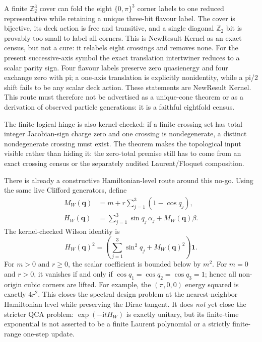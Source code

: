 \documentclass[11pt]{article}
\newcommand{\ii}{\mathrm{i}}
\newcommand{\id}{\mathbf{1}}
\begin{document}
A finite $\mathbb Z_2^3$ cover can fold the eight $\{0,\pi\}^3$ corner labels
to one reduced representative while retaining a unique three-bit flavour
label.  The cover is bijective, its deck action is free and transitive, and a
single diagonal $\mathbb Z_2$ bit is provably too small to label all corners.
This is NewResult{} Kernel{} as an exact census, but not a cure: it relabels
eight crossings and removes none.  For the present successive-axis symbol the
exact translation intertwiner reduces to a scalar parity sign.  Four flavour
labels preserve zero quasienergy and four exchange zero with pi; a one-axis
translation is explicitly nonidentity, while a pi/2 shift fails to be any
scalar deck action.  These statements are NewResult{} Kernel{}.  This route
must therefore not be advertised as a unique-cone theorem or as a derivation
of observed particle generations: it is a faithful eightfold census.

The finite logical hinge is also kernel-checked: if a finite crossing set has
total integer Jacobian-sign charge zero and one crossing is nondegenerate, a
distinct nondegenerate crossing must exist.  The theorem makes the topological
input visible rather than hiding it: the zero-total premise still has to come
from an exact crossing census or the separately audited Laurent/Floquet
composition.

There is already a constructive Hamiltonian-level route around this no-go.
Using the same live Clifford generators, define
\begin{align}
 M_W(\mathbf q)&=m+r\sum_{j=1}^{3}(1-\cos q_j),\\
 H_W(\mathbf q)&=\sum_{j=1}^{3}\sin q_j\,\alpha_j+M_W(\mathbf q)\beta.
\end{align}
The kernel-checked Wilson identity is
\begin{equation}\label{eq:wilsonsquare}
 H_W(\mathbf q)^2=
 \left(\sum_{j=1}^{3}\sin^2q_j+M_W(\mathbf q)^2\right)\id.
\end{equation}
For $m>0$ and $r\geq0$, the scalar coefficient is bounded below by $m^2$.
For $m=0$ and $r>0$, it vanishes if and only if
$\cos q_1=\cos q_2=\cos q_3=1$; hence all non-origin cubic corners are lifted.
For example, the $(\pi,0,0)$ energy squared is exactly $4r^2$.  This closes
the spectral design problem at the nearest-neighbor Hamiltonian level while
preserving the Dirac tangent.  It does \emph{not} yet close the stricter QCA
problem: $\exp(-\ii tH_W)$ is exactly unitary, but its finite-time exponential
is not asserted to be a finite Laurent polynomial or a strictly finite-range
one-step update.
\end{document}

